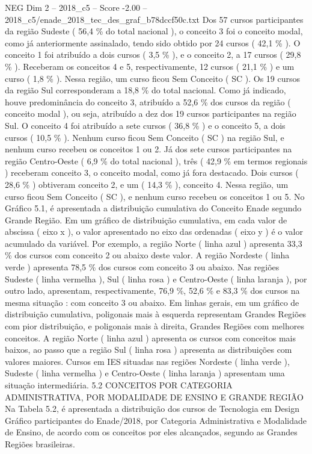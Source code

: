\begin{textsample}{NEG Dim 2 – 2018\_c5 – Score -2.00 – 2018\_c5/enade\_2018\_tec\_des\_graf\_b78dccf50c.txt}
Dos 57 cursos participantes da região Sudeste ( 56,4 \% do total nacional ), o conceito 3 foi o conceito modal, como já anteriormente assinalado, tendo sido obtido por 24 cursos ( 42,1 \% ).
O conceito 1 foi atribuído a dois cursos ( 3,5 \% ), e o conceito 2, a 17 cursos ( 29,8 \% ).
Receberam os conceitos 4 e 5, respectivamente, 12 cursos ( 21,1 \% ) e um curso ( 1,8 \% ).
Nessa região, um curso ficou Sem Conceito ( SC ).
Os 19 cursos da região Sul corresponderam a 18,8 \% do total nacional.
Como já indicado, houve predominância do conceito 3, atribuído a 52,6 \% dos cursos da região ( conceito modal ), ou seja, atribuído a dez dos 19 cursos participantes na região Sul.
O conceito 4 foi atribuído a sete cursos ( 36,8 \% ) e o conceito 5, a dois cursos ( 10,5 \% ).
Nenhum curso ficou Sem Conceito ( SC ) na região Sul, e nenhum curso recebeu os conceitos 1 ou 2.
Já dos sete cursos participantes na região Centro-Oeste ( 6,9 \% do total nacional ), três ( 42,9 \% em termos regionais ) receberam conceito 3, o conceito modal, como já fora destacado.
Dois cursos ( 28,6 \% ) obtiveram conceito 2, e um ( 14,3 \% ), conceito 4.
Nessa região, um curso ficou Sem Conceito ( SC ), e nenhum curso recebeu os conceitos 1 ou 5.
No Gráfico 5.1, é apresentada a distribuição cumulativa do Conceito Enade segundo Grande Região.
Em um gráfico de distribuição cumulativa, em cada valor de abscissa ( eixo x ), o valor apresentado no eixo das ordenadas ( eixo y ) é o valor acumulado da variável.
Por exemplo, a região Norte ( linha azul ) apresenta 33,3 \% dos cursos com conceito 2 ou abaixo deste valor.
A região Nordeste ( linha verde ) apresenta 78,5 \% dos cursos com conceito 3 ou abaixo.
Nas regiões Sudeste ( linha vermelha ), Sul ( linha rosa ) e Centro-Oeste ( linha laranja ), por outro lado, apresentam, respectivamente, 76,9 \%, 52,6 \% e 83,3 \% dos cursos na mesma situação : com conceito 3 ou abaixo.
Em linhas gerais, em um gráfico de distribuição cumulativa, poligonais mais à esquerda representam Grandes Regiões com pior distribuição, e poligonais mais à direita, Grandes Regiões com melhores conceitos.
A região Norte ( linha azul ) apresenta os cursos com conceitos mais baixos, ao passo que a região Sul ( linha rosa ) apresenta as distribuições com valores maiores.
Cursos em IES situadas nas regiões Nordeste ( linha verde ), Sudeste ( linha vermelha ) e Centro-Oeste ( linha laranja ) apresentam uma situação intermediária. 5.2 CONCEITOS POR CATEGORIA ADMINISTRATIVA, POR MODALIDADE DE ENSINO E GRANDE REGIÃO Na Tabela 5.2, é apresentada a distribuição dos cursos de Tecnologia em Design Gráfico participantes do Enade/2018, por Categoria Administrativa e Modalidade de Ensino, de acordo com os conceitos por eles alcançados, segundo as Grandes Regiões brasileiras.

\end{textsample}
